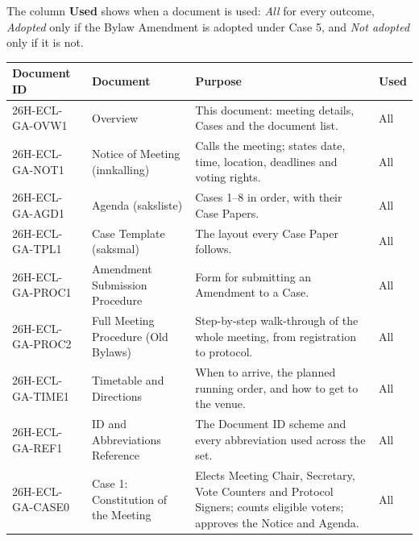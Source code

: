 \documentclass{../../../Common/Latex/Templates/rapport}
\begin{document}
The column \textbf{Used} shows when a document is used: \emph{All} for every outcome, \emph{Adopted} only if the Bylaw Amendment is adopted under Case 5, and \emph{Not adopted} only if it is not.

\begingroup
\small
\renewcommand{\arraystretch}{1.3}
\begin{longtable}{|L{3.2cm}|L{3.6cm}|L{5.3cm}|L{1.9cm}|}
  \hline
  \textbf{Document ID} & \textbf{Document} & \textbf{Purpose} & \textbf{Used} \\
  \hline
  \endhead
  26H-ECL-GA-OVW1    & Overview                                        & This document: meeting details, Cases and the document list.                                  & All \\
  \hline
  26H-ECL-GA-NOT1    & Notice of Meeting (innkalling)                  & Calls the meeting; states date, time, location, deadlines and voting rights.                  & All \\
  \hline
  26H-ECL-GA-AGD1    & Agenda (saksliste)                              & Cases 1--8 in order, with their Case Papers.                                                  & All \\
  \hline
  26H-ECL-GA-TPL1    & Case Template (saksmal)                         & The layout every Case Paper follows.                                                          & All \\
  \hline
  26H-ECL-GA-PROC1   & Amendment Submission Procedure                  & Form for submitting an Amendment to a Case.                                                   & All \\
  \hline
  26H-ECL-GA-PROC2   & Full Meeting Procedure (Old Bylaws)             & Step-by-step walk-through of the whole meeting, from registration to protocol.                & All \\
  \hline
  26H-ECL-GA-TIME1   & Timetable and Directions                        & When to arrive, the planned running order, and how to get to the venue.                       & All \\
  \hline
  26H-ECL-GA-REF1    & ID and Abbreviations Reference                  & The Document ID scheme and every abbreviation used across the set.                            & All \\
  \hline
  26H-ECL-GA-CASE0   & Case 1: Constitution of the Meeting             & Elects Meeting Chair, Secretary, Vote Counters and Protocol Signers; counts eligible voters; approves the Notice and Agenda. & All \\

\end{longtable}
\end{document}
